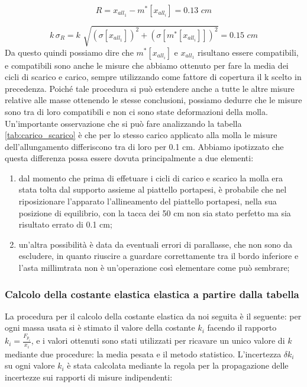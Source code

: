 \begin{equation*}
	R = x_{all_1} - m^*[x_{all_i}] = 0.13 \,\,cm
\end{equation*}

\begin{equation*}
	k\, \sigma_{R} = k\,\, \sqrt{(\sigma[x_{all_1}])^2 + (\sigma[m^*[x_{all_i}]])^2} = 0.15 \,\,cm
\end{equation*}
%
Da questo quindi possiamo dire che $m^*[x_{all_i}]$ e $x_{all_1}$ risultano essere compatibili, e compatibili sono anche le misure che abbiamo ottenuto per fare la media dei cicli di scarico e carico, sempre utilizzando come fattore di copertura il k scelto in precedenza.
Poiché tale procedura si può estendere anche a tutte le altre misure relative alle masse ottenendo le stesse conclusioni, possiamo dedurre che le misure sono tra di loro compatibili e non ci sono state deformazioni della molla.
Un'importante osservazione che si può fare analizzando la tabella \ref{tab:carico_scarico} è che per lo stesso carico applicato alla molla le misure dell'allungamento differiscono tra di loro per 0.1 cm. Abbiamo ipotizzato che questa differenza possa essere dovuta principalmente a due elementi:

\begin{enumerate}
	\item{dal momento che prima di effetuare i cicli di carico e scarico la molla era stata tolta dal supporto assieme al piattello portapesi, è probabile che nel riposizionare l'apparato l'allineamento del piattello portapesi, nella sua posizione di equilibrio, con la tacca dei 50 cm non sia stato perfetto ma sia risultato errato di 0.1 cm;}
	\item{un'altra possibilità è data da eventuali errori di parallasse, che non sono da escludere, in quanto riuscire a guardare correttamente tra il bordo inferiore e l'asta millimtrata non è un'operazione così elementare come può sembrare;}
\end{enumerate}

\subsubsection{Calcolo della costante elastica elastica a partire dalla tabella}

La procedura per il calcolo della costante elastica da noi seguita è il seguente:
per ogni massa usata si è stimato il valore della costante $k_i$ facendo il rapporto $k_{i} = \frac{F_{p_{i}}}{x_{i}}$,
e i valori ottenuti sono stati utilizzati per ricavare un unico valore di $k$ mediante due procedure: la media pesata e il metodo statistico.
L'incertezza $\delta k_{i}$ su ogni valore $k_i$ è stata calcolata mediante la regola per la propagazione delle incertezze sui rapporti di misure indipendenti:

